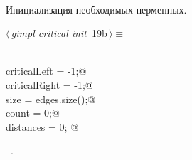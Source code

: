 \documentclass[12pt]{article}
\begin{document}
\paragraph{}
Инициализация необходимых перменных.
\begin{flushleft} \small
\begin{minipage}{\linewidth}\label{scrap33}\raggedright\small
{} $\langle\,${\itshape gimpl critical init}\nobreak\ {\footnotesize {19b}}$\,\rangle\equiv$
\vspace{-1ex}
\begin{list}{}{} \item
\mbox{}\verb@@\\
\mbox{}\verb@int criticalLeft = -1;@\\
\mbox{}\verb@int criticalRight = -1;@\\
\mbox{}\verb@int size = edges.size();@\\
\mbox{}\verb@int count = 0;@\\
\mbox{}\verb@double distances = 0; @\\
\mbox{}\verb@@{\NWsep}
\end{list}
\vspace{-1.5ex}
\footnotesize
\begin{list}{}{\setlength{\itemsep}{-\parsep}\setlength{\itemindent}{-\leftmargin}}
\item \NWtxtMacroRefIn\ .

\item{}
\end{list}
\end{minipage}\vspace{4ex}
\end{flushleft}
\end{document}
